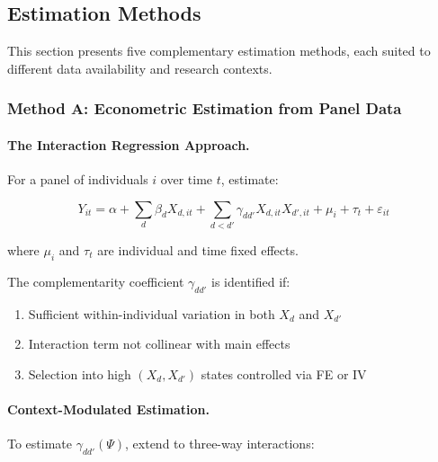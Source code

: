 \subsection{Estimation Methods}
\label{sec:BBB-methods}

This section presents five complementary estimation methods, each suited to 
different data availability and research contexts.

\subsubsection{Method A: Econometric Estimation from Panel Data}

\paragraph{The Interaction Regression Approach.}

For a panel of individuals $i$ over time $t$, estimate:

\begin{equation}
Y_{it} = \alpha + \sum_d \beta_d X_{d,it} + \sum_{d < d'} \gamma_{dd'} X_{d,it} X_{d',it} + \mu_i + \tau_t + \varepsilon_{it}
\label{eq:interaction-regression}
\end{equation}

where $\mu_i$ and $\tau_t$ are individual and time fixed effects.

\begin{proposition}
\label{prop:identification}
The complementarity coefficient $\gamma_{dd'}$ is identified if:
\begin{enumerate}
    \item Sufficient within-individual variation in both $X_d$ and $X_{d'}$
    \item Interaction term not collinear with main effects
    \item Selection into high $(X_d, X_{d'})$ states controlled via FE or IV
\end{enumerate}
\end{proposition}

\paragraph{Context-Modulated Estimation.}

To estimate $\gamma_{dd'}(\Psi)$, extend to three-way interactions:

